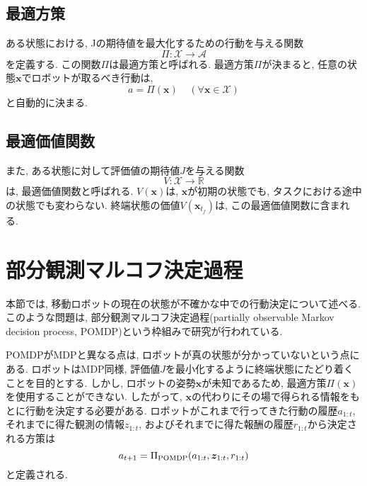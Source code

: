 \subsection{最適方策}
ある状態における, Jの期待値を最大化するための行動を与える関数
\begin{equation}
\label{policy}
  \Pi : \mathcal{X} \rightarrow \mathcal{A}
\end{equation}
を定義する. 
この関数$\Pi$は最適方策と呼ばれる. 
最適方策$\Pi$が決まると, 任意の状態$\bm{x}$でロボットが取るべき行動は, 
\begin{equation}
\label{oprimal action}
  a = \Pi(\bm{x}) \;\;\;\; (\forall \bm{x} \in \mathcal{X})
\end{equation}
と自動的に決まる. 

\subsection{最適価値関数}
また, ある状態に対して評価値の期待値$J$を与える関数
\begin{equation}
\label{value function}
  V : \mathcal{X} \rightarrow \mathbb{R}
\end{equation}
は, 最適価値関数と呼ばれる. 
$V(\bm{x})$は, $\bm{x}$が初期の状態でも, タスクにおける途中の状態でも変わらない. 
終端状態の価値$V(\bm{x}_{t_{f}})$は, この最適価値関数に含まれる. 


\section{部分観測マルコフ決定過程} \label{section:pomdp}
本節では, 移動ロボットの現在の状態が不確かな中での行動決定について述べる. 
このような問題は, 部分観測マルコフ決定過程(partially observable Markov decision process, POMDP)という枠組みで研究が行われている. 

POMDPがMDPと異なる点は, ロボットが真の状態が分かっていないという点にある. 
ロボットはMDP同様, 評価値$J$を最小化するように終端状態にたどり着くことを目的とする. 
しかし, ロボットの姿勢$\bm{x}$が未知であるため, 最適方策$\Pi(\bm{x})$を使用することができない. 
したがって, $\bm{x}$の代わりにその場で得られる情報をもとに行動を決定する必要がある. 
ロボットがこれまで行ってきた行動の履歴$a_{1:t}$, それまでに得た観測の情報$z_{1:t}$, およびそれまでに得た報酬の履歴$r_{1:t}$から決定される方策は
\begin{equation}
\label{policy pomdp}
  a_{t+1} = \Pi_{\rm POMDP} (a_{1:t}, \bm{z}_{1:t}, r_{1:t})
\end{equation}
と定義される. 

